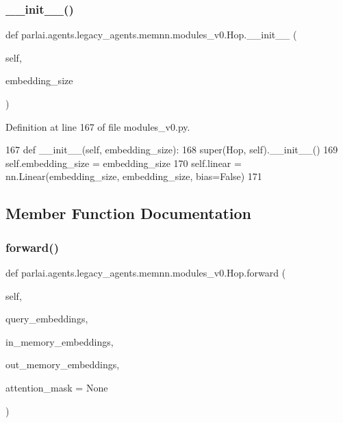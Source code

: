 \subsubsection{\texorpdfstring{\+\_\+\+\_\+init\+\_\+\+\_\+()}{\_\_init\_\_()}}
{\footnotesize\ttfamily def parlai.\+agents.\+legacy\+\_\+agents.\+memnn.\+modules\+\_\+v0.\+Hop.\+\_\+\+\_\+init\+\_\+\+\_\+ (\begin{DoxyParamCaption}\item[{}]{self,  }\item[{}]{embedding\+\_\+size }\end{DoxyParamCaption})}



Definition at line 167 of file modules\+\_\+v0.\+py.


\begin{DoxyCode}
167     \textcolor{keyword}{def }\_\_init\_\_(self, embedding\_size):
168         super(Hop, self).\_\_init\_\_()
169         self.embedding\_size = embedding\_size
170         self.linear = nn.Linear(embedding\_size, embedding\_size, bias=\textcolor{keyword}{False})
171 
\end{DoxyCode}


\subsection{Member Function Documentation}
\mbox{\label{classparlai_1_1agents_1_1legacy__agents_1_1memnn_1_1modules__v0_1_1Hop_a19e28fabccb536fcc5f0db0e92a7a135}} 
\subsubsection{\texorpdfstring{forward()}{forward()}}
{\footnotesize\ttfamily def parlai.\+agents.\+legacy\+\_\+agents.\+memnn.\+modules\+\_\+v0.\+Hop.\+forward (\begin{DoxyParamCaption}\item[{}]{self,  }\item[{}]{query\+\_\+embeddings,  }\item[{}]{in\+\_\+memory\+\_\+embeddings,  }\item[{}]{out\+\_\+memory\+\_\+embeddings,  }\item[{}]{attention\+\_\+mask = {\ttfamily None} }\end{DoxyParamCaption})}



